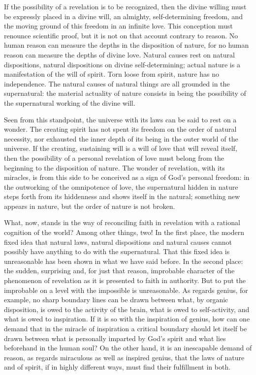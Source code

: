 \documentclass[12pt,a4paper,openany]{book}
\newcommand{\opage}[1]{\marginnote{\footnotesize\textit{[#1]}}}
\begin{document}
If the possibility of a revelation is to be recognized, then the divine
willing must be expressly placed in a divine will, an almighty,
self-determining freedom, and the moving ground of this freedom in an
infinite love. This conception must renounce scientific proof, but it is
not on that account contrary to reason. No human reason can measure the
depths in the disposition of nature, for no human reason can measure the
depths of divine love. Natural causes rest on natural dispositions,
natural dispositions on divine self-determining; actual nature is a
manifestation of the will of spirit. Torn loose from spirit, nature has
no independence. The natural causes of natural things are all grounded in
the supernatural: the material actuality of nature consists in being the
possibility of the supernatural working of the divine will.

Seen from this standpoint, the universe with its laws can be said to rest
on a wonder. The creating spirit has not spent its freedom on the order
of natural necessity, nor exhausted the inner depth of its being in the
outer world of the universe. If the creating, sustaining will is a \opage{39}will
of love that will reveal itself, then the possibility of a personal
revelation of love must belong from the beginning to the disposition of
nature. The wonder of revelation, with its miracles, is from this side to
be conceived as a sign of God's personal freedom: in the outworking of
the omnipotence of love, the supernatural hidden in nature steps forth
from its hiddenness and shows itself in the natural; something new
appears in nature, but the order of nature is not broken.

What, now, stands in the way of reconciling faith in revelation with a
rational cognition of the world? Among other things, two! In the first
place, the modern fixed idea that natural laws, natural dispositions and
natural causes cannot possibly have anything to do with the
supernatural. That this fixed idea is unreasonable has been shown in what
we have said before. In the second place: the sudden, surprising and, for
just that reason, improbable character of the phenomenon of revelation as
it is presented to faith in authority. But to put the improbable on a
level with the impossible is unreasonable. As regards genius, for
example, no sharp boundary lines can be drawn between what, by organic
disposition, is owed to the activity of the brain, what is owed to
self-activity, and what is owed to inspiration. If it is so with the
inspiration of genius, how can one demand that in the miracle of
inspiration a critical boundary should let itself be drawn between what
is personally imparted by God's spirit and what lies beforehand in the
human soul? On the other hand, it is an inescapable demand of reason, as
regards miraculous as well as inspired genius, that the laws of nature
and of spirit, if in highly different ways, must find their fulfillment
in both.
\end{document}
